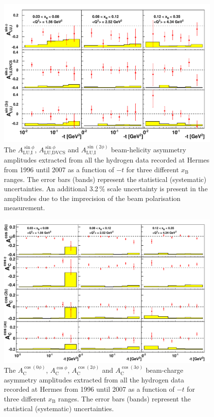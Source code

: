 \begin{figure}
 \begin{center}
 \includegraphics[width=15cm]{bsadvcsplots_tc_xbjrange_eml_par13_bin6_9607_pic_update}
  \caption{The $A_{\textrm{LU,I}}^{\sin\phi}$, $A_{\textrm{LU,DVCS}}^{\sin\phi}$ and
$A_{\textrm{LU,I}}^{\sin(2\phi)}$ beam-helicity asymmetry amplitudes extracted from all the hydrogen data recorded at H{\sc ermes}
from 1996 until 2007 as a function of $-t$ for three different $x_{\textrm{B}}$ ranges. The error bars (bands) represent the statistical
(systematic) uncertainties. An additional 3.2\,\% scale uncertainty is present in the amplitudes due to the imprecision of
the beam polarisation measurement.}
  \label{bsa_xbjrange2}
 \end{center}
\end{figure}

\begin{figure}
  \begin{center}
    \includegraphics[width=15cm]{bcaplots_tc_xnjrange_eml_par13_bin6_9607_pic}
    \caption{The $A_{\textrm{C}}^{\cos(0\phi)}$, $A_{\textrm{C}}^{\cos\phi}$, $A_{\textrm{C}}^{\cos(2\phi)}$ and $A_{\textrm{C}}^{\cos(3\phi)}$ beam-charge asymmetry amplitudes extracted from all the hydrogen data recorded at H{\sc ermes} from 1996 until 2007 as a function of $-t$ for three different $x_{\textrm{B}}$ ranges. The error bars (bands) represent the statistical (systematic) uncertainties.}
  \label{bca_xbjrange2}
 \end{center}
\end{figure}

